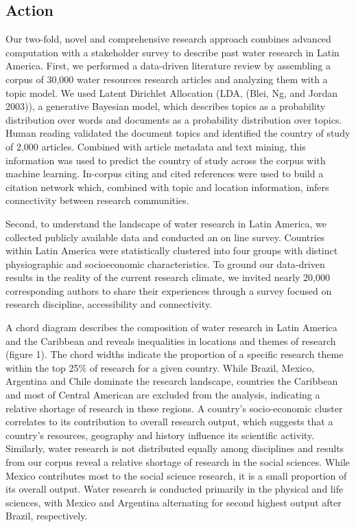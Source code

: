 \documentclass[]{article}
\begin{document}
\hypertarget{action}{%
\subsection{Action}\label{action}}

Our two-fold, novel and comprehensive research approach combines
advanced computation with a stakeholder survey to describe past water
research in Latin America. First, we performed a data-driven literature
review by assembling a corpus of 30,000 water resources research
articles and analyzing them with a topic model. We used Latent Dirichlet
Allocation (LDA, (Blei, Ng, and Jordan 2003)), a generative Bayesian
model, which describes topics as a probability distribution over words
and documents as a probability distribution over topics. Human reading
validated the document topics and identified the country of study of
2,000 articles. Combined with article metadata and text mining, this
information was used to predict the country of study across the corpus
with machine learning. In-corpus citing and cited references were used
to build a citation network which, combined with topic and location
information, infers connectivity between research communities.

Second, to understand the landscape of water research in Latin America,
we collected publicly available data and conducted an on line survey.
Countries within Latin America were statistically clustered into four
groups with distinct physiographic and socioeconomic characteristics. To
ground our data-driven results in the reality of the current research
climate, we invited nearly 20,000 corresponding authors to share their
experiences through a survey focused on research discipline,
accessibility and connectivity.

A chord diagram describes the composition of water research in Latin
America and the Caribbean and reveals inequalities in locations and
themes of research (figure 1). The chord widths indicate the proportion
of a specific research theme within the top 25\% of research for a given
country. While Brazil, Mexico, Argentina and Chile dominate the research
landscape, countries the Caribbean and most of Central American are
excluded from the analysis, indicating a relative shortage of research
in these regions. A country's socio-economic cluster correlates to its
contribution to overall research output, which suggests that a country's
resources, geography and history influence its scientific activity.
Similarly, water research is not distributed equally among disciplines
and results from our corpus reveal a relative shortage of research in
the social sciences. While Mexico contributes most to the social science
research, it is a small proportion of its overall output. Water research
is conducted primarily in the physical and life sciences, with Mexico
and Argentina alternating for second highest output after Brazil,
respectively.
\end{document}
